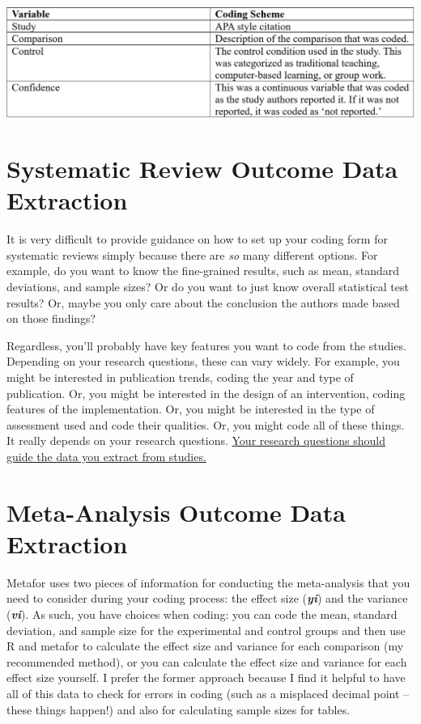 \documentclass[
]{book}
\begin{document}
\includegraphics[width=1\textwidth,height=\textheight]{images/vartable.PNG}

\hypertarget{systematic-review-outcome-data-extraction}{%
\section{Systematic Review Outcome Data Extraction}\label{systematic-review-outcome-data-extraction}}

It is very difficult to provide guidance on how to set up your coding form for systematic reviews simply because there are \emph{so} many different options. For example, do you want to know the fine-grained results, such as mean, standard deviations, and sample sizes? Or do you want to just know overall statistical test results? Or, maybe you only care about the conclusion the authors made based on those findings?

Regardless, you'll probably have key features you want to code from the studies. Depending on your research questions, these can vary widely. For example, you might be interested in publication trends, coding the year and type of publication. Or, you might be interested in the design of an intervention, coding features of the implementation. Or, you might be interested in the type of assessment used and code their qualities. Or, you might code all of these things. It really depends on your research questions. \ul{Your research questions should guide the data you extract from studies.}

\hypertarget{meta-analysis-outcome-data-extraction}{%
\section{Meta-Analysis Outcome Data Extraction}\label{meta-analysis-outcome-data-extraction}}

Metafor\citep{viechtbauer2010} uses two pieces of information for conducting the meta-analysis that you need to consider during your coding process: the effect size (\textbf{\emph{yi}}) and the variance (\textbf{\emph{vi}}). As such, you have choices when coding: you can code the mean, standard deviation, and sample size for the experimental and control groups and then use R and metafor to calculate the effect size and variance for each comparison (my recommended method), or you can calculate the effect size and variance for each effect size yourself. I prefer the former approach because I find it helpful to have all of this data to check for errors in coding (such as a misplaced decimal point -- these things happen!) and also for calculating sample sizes for tables.
\end{document}
